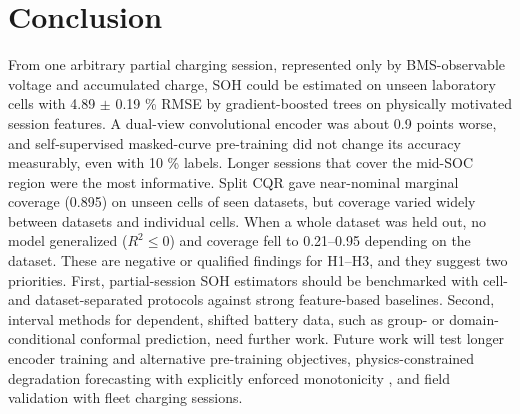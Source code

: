 \documentclass[journal]{IEEEtran}
\begin{document}
\section{Conclusion}
From one arbitrary partial charging session, represented only by BMS-observable voltage and accumulated charge, SOH could be estimated on unseen laboratory cells with 4.89 $\pm$ 0.19 \% RMSE by gradient-boosted trees on physically motivated session features. A dual-view convolutional encoder was about 0.9 points worse, and self-supervised masked-curve pre-training did not change its accuracy measurably, even with 10 \% labels. Longer sessions that cover the mid-SOC region were the most informative. Split CQR gave near-nominal marginal coverage (0.895) on unseen cells of seen datasets, but coverage varied widely between datasets and individual cells. When a whole dataset was held out, no model generalized (\(R^2\le0\)) and coverage fell to 0.21--0.95 depending on the dataset. These are negative or qualified findings for H1--H3, and they suggest two priorities. First, partial-session SOH estimators should be benchmarked with cell- and dataset-separated protocols against strong feature-based baselines. Second, interval methods for dependent, shifted battery data, such as group- or domain-conditional conformal prediction, need further work. Future work will test longer encoder training and alternative pre-training objectives, physics-constrained degradation forecasting with explicitly enforced monotonicity \cite{b18}, and field validation with fleet charging sessions.
\end{document}
